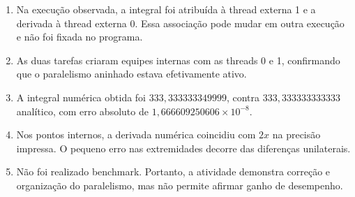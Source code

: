 \begin{enumerate}
    \item Na execução observada, a integral foi atribuída à thread externa 1
    e a derivada à thread externa 0. Essa associação pode mudar em outra
    execução e não foi fixada no programa.

    \item As duas tarefas criaram equipes internas com as threads 0 e 1,
    confirmando que o paralelismo aninhado estava efetivamente ativo.

    \item A integral numérica obtida foi
    $333{,}333333349999$, contra
    $333{,}333333333333$ analítico, com erro absoluto de
    $1{,}666609250606\times10^{-8}$.

    \item Nos pontos internos, a derivada numérica coincidiu com $2x$ na
    precisão impressa. O pequeno erro nas extremidades decorre das diferenças
    unilaterais.

    \item Não foi realizado benchmark. Portanto, a atividade demonstra
    correção e organização do paralelismo, mas não permite afirmar ganho de
    desempenho.

\end{enumerate}

